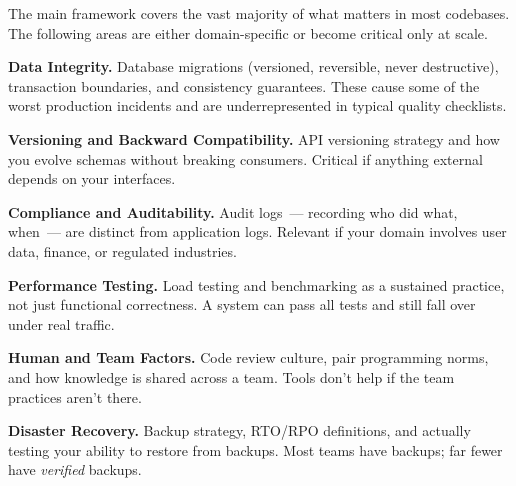 The main framework covers the vast majority of what matters in most codebases. The following areas are either domain-specific or become critical only at scale.

\textbf{Data Integrity.} Database migrations (versioned, reversible, never destructive), transaction boundaries, and consistency guarantees. These cause some of the worst production incidents and are underrepresented in typical quality checklists.

\textbf{Versioning and Backward Compatibility.} API versioning strategy and how you evolve schemas without breaking consumers. Critical if anything external depends on your interfaces.

\textbf{Compliance and Auditability.} Audit logs~--- recording who did what, when~--- are distinct from application logs. Relevant if your domain involves user data, finance, or regulated industries.

\textbf{Performance Testing.} Load testing and benchmarking as a sustained practice, not just functional correctness. A system can pass all tests and still fall over under real traffic.

\textbf{Human and Team Factors.} Code review culture, pair programming norms, and how knowledge is shared across a team. Tools don't help if the team practices aren't there.

\textbf{Disaster Recovery.} Backup strategy, RTO/RPO definitions, and actually testing your ability to restore from backups. Most teams have backups; far fewer have \emph{verified} backups.
